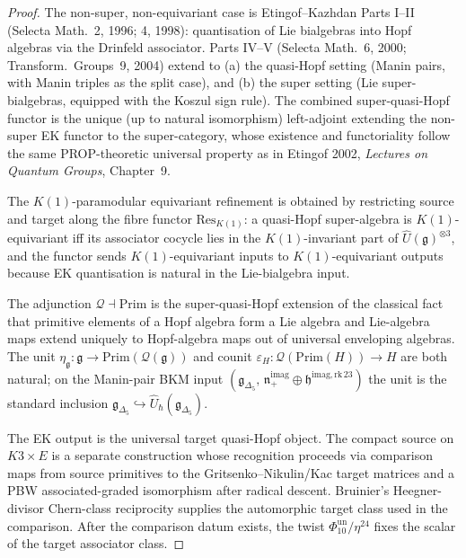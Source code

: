 \begin{proof}
The non-super, non-equivariant case is Etingof--Kazhdan Parts I--II (Selecta Math.~2,
1996; 4, 1998): quantisation of Lie bialgebras into Hopf algebras via the Drinfeld
associator. Parts IV--V (Selecta Math.~6, 2000; Transform.~Groups~9, 2004) extend to
(a) the quasi-Hopf setting (Manin pairs, with Manin triples as the split case), and (b) the super
setting (Lie super-bialgebras, equipped with the Koszul sign rule). The combined
super-quasi-Hopf functor is the unique (up to natural isomorphism) left-adjoint
extending the non-super EK functor to the super-category, whose existence and
functoriality follow the same PROP-theoretic universal property as in Etingof
2002, \emph{Lectures on Quantum Groups}, Chapter~9.

The $K(1)$-paramodular equivariant refinement is obtained by restricting source and
target along the fibre functor $\mathrm{Res}_{K(1)}$: a quasi-Hopf super-algebra is
$K(1)$-equivariant iff its associator cocycle lies in the $K(1)$-invariant part of
$\widehat{U}(\mathfrak{g})^{\otimes 3}$, and the functor sends
$K(1)$-equivariant inputs to $K(1)$-equivariant outputs because EK quantisation is
natural in the Lie-bialgebra input.

The adjunction $\mathcal{Q}\dashv \mathrm{Prim}$ is the super-quasi-Hopf extension of
the classical fact that primitive elements of a Hopf algebra form a Lie algebra and
Lie-algebra maps extend uniquely to Hopf-algebra maps out of universal enveloping
algebras. The unit $\eta_{\mathfrak{g}}\colon
\mathfrak{g} \to \mathrm{Prim}(\mathcal{Q}(\mathfrak{g}))$ and counit
$\varepsilon_H\colon \mathcal{Q}(\mathrm{Prim}(H)) \to H$ are both natural; on the
Manin-pair BKM input $(\mathfrak{g}_{\Delta_5},\,\mathfrak{n}_+^{\mathrm{imag}}\oplus
\mathfrak{h}^{\mathrm{imag,rk\,23}})$ the unit is the standard inclusion
$\mathfrak{g}_{\Delta_5}\hookrightarrow \widehat{U}_{\hbar}(\mathfrak{g}_{\Delta_5})$.

The EK output is the universal target quasi-Hopf object. The compact
source on $K3 \times E$ is a separate construction whose recognition
proceeds via comparison maps from source primitives to the
Gritsenko--Nikulin/Kac target matrices and a PBW associated-graded
isomorphism after radical descent. Bruinier's Heegner-divisor
Chern-class reciprocity supplies the automorphic target class used in
the comparison. After the comparison datum exists, the twist
$\Phi_{10}^{\mathrm{un}}/\eta^{24}$ fixes the scalar of the target
associator class.
\end{proof}

